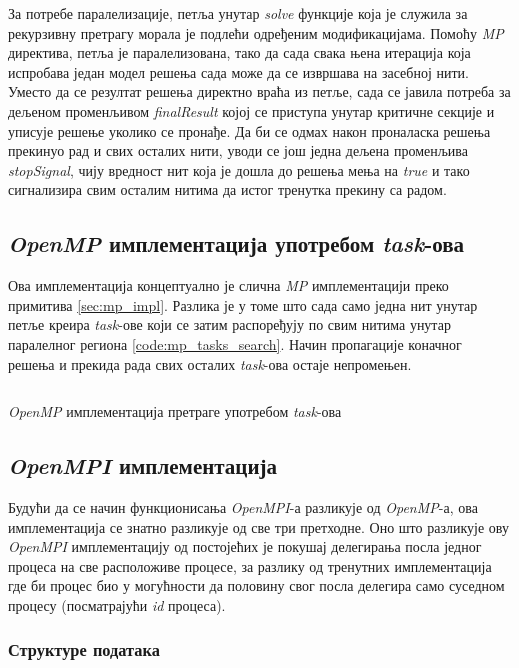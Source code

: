 За потребе паралелизације, петља унутар \textit{solve} функције која је служила за рекурзивну претрагу морала је подлећи одређеним модификацијама. Помоћу \textit{MP} директива, петља је паралелизована, тако да сада свака њена итерација која испробава један модел решења сада може да се извршава на засебној нити. Уместо да се резултат решења директно враћа из петље, сада се јавила потреба за дељеном променљивом \textit{finalResult} којој се приступа унутар критичне секције и уписује решење уколико се пронађе. Да би се одмах након проналаска решења прекинуо рад и свих осталих нити, уводи се још једна дељена променљива \textit{stopSignal}, чију вредност нит која је дошла до решења мења на \textit{true} и тако сигнализира свим осталим нитима да истог тренутка прекину са радом.

\subsection{\textit{OpenMP} имплементација употребом \textit{task}-ова}

Ова имплементација концептуално је слична \textit{MP} имплементацији преко примитива \ref{sec:mp_impl}. Разлика је у томе што сада само једна нит унутар петље креира \textit{task}-ове који се затим распоређују по свим нитима унутар паралелног региона \ref{code:mp_tasks_search}. Начин пропагације коначног решења и прекида рада свих осталих \textit{task}-ова остаје непромењен.

\begin{listing}[H]
\inputminted{c}{kodovi/mp_tasks_search.c}
\caption{\textit{OpenMP} имплементација претраге употребом \textit{task}-ова}
\label{code:mp_tasks_search}
\end{listing}

\subsection{\textit{OpenMPI} имплементација} 
Будући да се начин функционисања \textit{OpenMPI}-а \cite{open_mpi} разликује од \textit{OpenMP}-а, ова имплементација се знатно разликује од све три претходне.
Оно што разликује ову \textit{OpenMPI} имплементацију од постојећих је покушај делегирања посла једног процеса на све расположиве процесе, за разлику од тренутних имплементација где би процес био у могућности да половину свог посла делегира само суседном процесу (посматрајући \textit{id} процеса).\\

\subsubsection{Структуре података}

